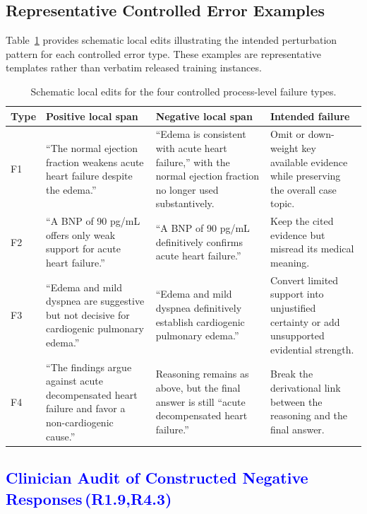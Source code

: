 \documentclass[a4paper,fleqn,doubleblind]{cas-sc}
\DeclareRobustCommand{\added}[1]{\textcolor{blue}{#1}}
\DeclareRobustCommand{\revtag}[1]{\textcolor{blue}{\scriptsize\,(\textbf{#1})}}
\begin{document}
\subsection{Representative Controlled Error Examples}
\label{app:negative_examples}

Table~\ref{tab:negative_examples} provides schematic local edits illustrating the intended perturbation pattern for each controlled error type. These examples are representative templates rather than verbatim released training instances.

\begin{table}[htbp]
    \centering
    \caption{Schematic local edits for the four controlled process-level failure types.}
    \label{tab:negative_examples}
    \begin{tabular}{p{}p{}p{}p{}}
        \toprule
        \textbf{Type} & \textbf{Positive local span} & \textbf{Negative local span} & \textbf{Intended failure} \\
        \midrule
        F1 & ``The normal ejection fraction weakens acute heart failure despite the edema.'' & ``Edema is consistent with acute heart failure,'' with the normal ejection fraction no longer used substantively. & Omit or down-weight key available evidence while preserving the overall case topic. \\
        F2 & ``A BNP of 90 pg/mL offers only weak support for acute heart failure.'' & ``A BNP of 90 pg/mL definitively confirms acute heart failure.'' & Keep the cited evidence but misread its medical meaning. \\
        F3 & ``Edema and mild dyspnea are suggestive but not decisive for cardiogenic pulmonary edema.'' & ``Edema and mild dyspnea definitively establish cardiogenic pulmonary edema.'' & Convert limited support into unjustified certainty or add unsupported evidential strength. \\
        F4 & ``The findings argue against acute decompensated heart failure and favor a non-cardiogenic cause.'' & Reasoning remains as above, but the final answer is still ``acute decompensated heart failure.'' & Break the derivational link between the reasoning and the final answer. \\
        \bottomrule
\end{tabular}
\end{table}

\subsection{\added{Clinician Audit of Constructed Negative Responses}\revtag{R1.9,R4.3}}
\label{app:negative_audit_details}
\end{document}
